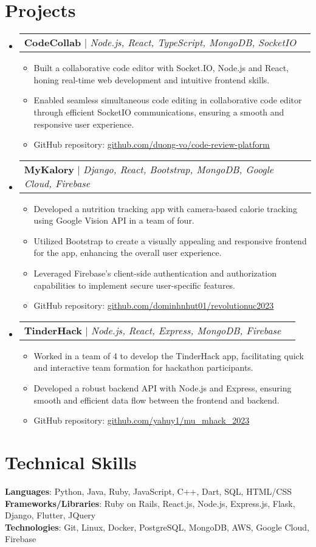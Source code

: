 \documentclass[letterpaper,11pt]{article}
\makeatletter
\newcommand{\resumeItem}[1]{
  \item\small{
    {#1 \vspace{-2pt}}
  }
}
\newcommand{\resumeProjectHeading}[2]{
    \item
    \begin{tabular*}{0.97\textwidth}{l@{\extracolsep{\fill}}r}
      \small#1 & #2 \\
    \end{tabular*}\vspace{-7pt}
}
\newcommand{\resumeSubHeadingListStart}{\begin{itemize}[leftmargin=0.15in, label={}]}
\newcommand{\resumeSubHeadingListEnd}{\end{itemize}}
\newcommand{\resumeItemListStart}{\begin{itemize}}
\newcommand{\resumeItemListEnd}{\end{itemize}\vspace{-5pt}}
\makeatother
\begin{document}
\section{Projects}
    \resumeSubHeadingListStart
      \resumeProjectHeading
          {\textbf{CodeCollab} $|$ \emph{Node.js, React, TypeScript, MongoDB, SocketIO}}{}
          \resumeItemListStart
            \resumeItem{Built a collaborative code editor with Socket.IO, Node.js and React, honing real-time web development and intuitive frontend skills.}
            \resumeItem{Enabled seamless simultaneous code editing in collaborative code editor through efficient SocketIO communications, ensuring a smooth and responsive user experience.}
            \resumeItem{GitHub repository: \href{https://github.com/duong-vo/code-review-platform}{\underline{github.com/duong-vo/code-review-platform}}}
          \resumeItemListEnd
      \resumeProjectHeading
          {\textbf{MyKalory} $|$ \emph{Django, React, Bootstrap, MongoDB, Google Cloud, Firebase}}{}
          \resumeItemListStart
            \resumeItem{Developed a nutrition tracking app with camera-based calorie tracking using Google Vision API in a team of four.}
            \resumeItem{Utilized Bootstrap to create a visually appealing and responsive frontend for the app, enhancing the overall user experience.}
            \resumeItem{Leveraged Firebase's client-side authentication and authorization capabilities to implement secure user-specific features.}
            \resumeItem{GitHub repository: \href{https://github.com/dominhnhut01/revolutionuc2023}{\underline{github.com/dominhnhut01/revolutionuc2023}}}
          \resumeItemListEnd
      \resumeProjectHeading
          {\textbf{TinderHack} $|$ \emph{Node.js, React, Express, MongoDB, Firebase}} {}
          \resumeItemListStart
            \resumeItem{Worked in a team of 4 to develop the TinderHack app, facilitating quick and interactive team formation for hackathon participants.}
            \resumeItem{Developed a robust backend API with Node.js and Express, ensuring smooth and efficient data flow between the frontend and backend.}
            \resumeItem{GitHub repository: \href{https://github.com/yahuy1/mu\_mhack\_2023}{\underline{github.com/yahuy1/mu\_mhack\_2023}}}
          \resumeItemListEnd
    \resumeSubHeadingListEnd




%
\section{Technical Skills}
 \begin{itemize}[leftmargin=0.15in, label={}]
    \small{\item{
     \textbf{Languages}{: Python, Java, Ruby, JavaScript, C++, Dart, SQL, HTML/CSS} \\
     \textbf{Frameworks/Libraries}{: Ruby on Rails, React.js, Node.js, Express.js, Flask, Django, Flutter, JQuery} \\
     \textbf{Technologies}{: Git, Linux, Docker, PostgreSQL, MongoDB, AWS, Google Cloud, Firebase} \\
    }}
 \end{itemize}


\end{document}
